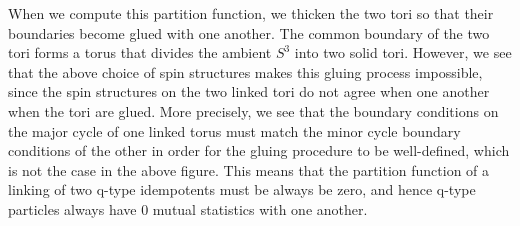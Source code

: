\documentclass[12pt,a4paper]{article}
\begin{document}
When we compute this partition function, we thicken the two tori so that their boundaries become glued with one another. The common boundary of the two tori forms a torus that divides the ambient $S^3$ into two solid tori. However, we see that the above choice of spin structures makes this gluing process impossible, since the spin structures on the two linked tori do not agree when one another when the tori are glued. More precisely, we see that the boundary conditions on the major cycle of one linked torus must match the minor cycle boundary conditions of the other in order for the gluing procedure to be well-defined, which is not the case in the above figure. This means that the partition function of a linking of two q-type idempotents must be always be zero, and hence q-type particles always have 0 mutual statistics with one another. 
 
 
 
\end{document}
